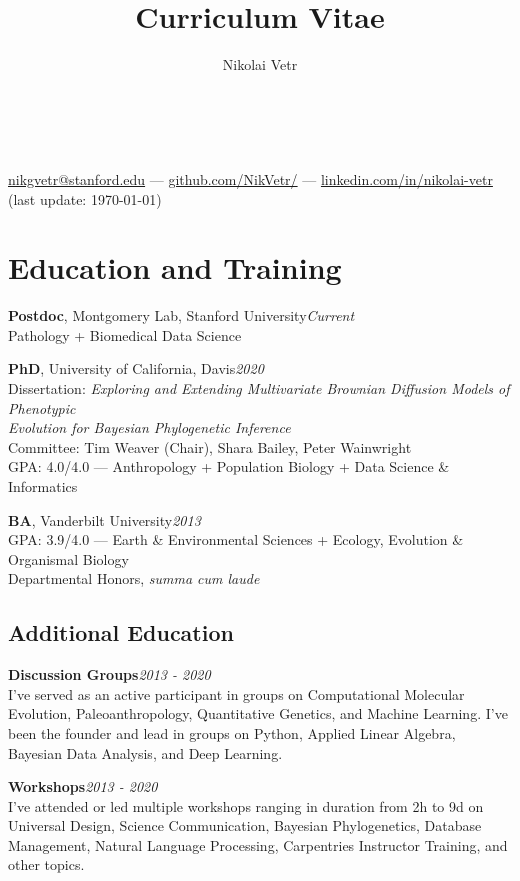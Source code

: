 \documentclass[12pt]{article}
\makeatletter
\newcommand{\cvcolor}{\color{DarkRed}} %
\renewcommand{\maketitle}{
\begin{center}

{\Huge\theauthor}\\
\vspace{0.25em}
{\Large \cvcolor{Stanford University, California}}\\

\href{mailto:nikgvetr@stanford.edu}{nikgvetr@stanford.edu} --- \href{https://www.github.com/NikVetr/}{github.com/NikVetr/} --- \href{https://www.linkedin.com/in/nikolai-vetr}{linkedin.com/in/nikolai-vetr}\\

{\color{Gray}(last update: \today)}
\end{center}
}
\makeatother
\begin{document}
\title{Curriculum Vitae} %
\author{Nikolai Vetr}

\maketitle

\vspace{-1.5em}

\section{Education and Training}

\textbf{Postdoc}, Montgomery Lab, Stanford University\hfill\emph{Current}\\
Pathology + Biomedical Data Science
\vspace{-0.25em}

\textbf{PhD}, University of California, Davis\hfill\emph{2020}\\
Dissertation: \textit{Exploring and Extending Multivariate Brownian Diffusion Models of Phenotypic\\
\hspace*{22mm} Evolution for Bayesian Phylogenetic Inference}\\
Committee: Tim Weaver (Chair), Shara Bailey, Peter Wainwright\\
GPA: 4.0/4.0 — Anthropology + Population Biology + Data Science \& Informatics

\textbf{BA}, Vanderbilt University\hfill\emph{2013}\\
GPA: 3.9/4.0 — Earth \& Environmental Sciences + Ecology, Evolution \& Organismal Biology\\
Departmental Honors, \textit{summa cum laude}\\
\vspace{-1.25em}
\subsection{Additional Education}

\textbf{Discussion Groups}\hfill\emph{2013 - 2020}\\
I've served as an active participant in groups on Computational Molecular Evolution, Paleoanthropology, Quantitative Genetics, and Machine Learning. I've been the founder and lead in groups on Python, Applied Linear Algebra, Bayesian Data Analysis, and Deep Learning.

\textbf{Workshops}\hfill\emph{2013 - 2020}\\
I've attended or led multiple workshops ranging in duration from 2h to 9d on Universal Design, Science Communication, Bayesian Phylogenetics, Database Management, Natural Language Processing, Carpentries Instructor Training, and other topics.
\end{document}
